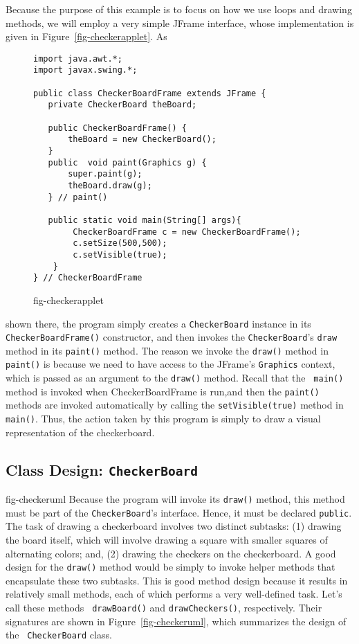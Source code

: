 Because the purpose of this example is to focus on how we use loops
and drawing methods, we will employ a very simple JFrame interface,
whose implementation is given in Figure~\ref{fig-checkerapplet}.  As
\begin{figure}[h]
\jjjprogstart
\begin{jjjlisting}
\begin{lstlisting}
import java.awt.*;
import javax.swing.*;

public class CheckerBoardFrame extends JFrame {
   private CheckerBoard theBoard;

   public CheckerBoardFrame() {
       theBoard = new CheckerBoard();
   }
   public  void paint(Graphics g) {
       super.paint(g);
       theBoard.draw(g);
   } // paint()

   public static void main(String[] args){
        CheckerBoardFrame c = new CheckerBoardFrame();
        c.setSize(500,500);
        c.setVisible(true);
    }
} // CheckerBoardFrame
\end{lstlisting}
\end{jjjlisting}
{fig-checkerapplet}
\end{figure}
shown there, the program simply creates a {\tt CheckerBoard} instance
in its {\tt CheckerBoardFrame()} constructor, and then invokes the {\tt CheckerBoard}'s
{\tt draw} method in its {\tt paint()} method. The reason we invoke
the {\tt draw()} method in {\tt paint()} is because we need to have
access to the JFrame's {\tt Graphics} context, which is passed as an
argument to the {\tt draw()} method. Recall that the {\tt
  main()} method is invoked when CheckerBoardFrame is run,and
then the {\tt paint()} methods are invoked automatically by calling 
the {\tt setVisible(true)} method in {\tt main()}.  Thus, the action
taken by this program is simply to draw a visual representation of the
checkerboard.


\subsection*{Class Design: {\tt CheckerBoard}}
{fig-checkeruml}
\noindent Because the program will invoke its {\tt draw()} method, this
method must be part of the {\tt CheckerBoard}'s interface.  Hence, it
must be declared {\tt public}.  The task of drawing a checkerboard
involves two distinct subtasks: (1) drawing the board itself, which
will involve drawing a square with smaller squares of alternating
colors; and, (2) drawing the checkers on the checkerboard.  A good
design for the {\tt draw()} method would be simply to invoke helper
methods that encapsulate these two subtasks. This is good method
design because it results in relatively small methods, each of which
performs a very well-defined task.  Let's call these methods {\tt
drawBoard()} and {\tt drawCheckers()}, respectively.  Their signatures
are shown in Figure~\ref{fig-checkeruml}, which summarizes the design of the {\tt
CheckerBoard} class.

